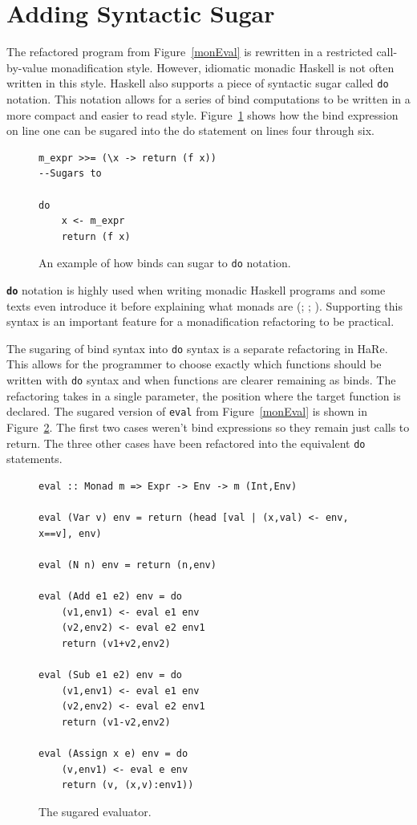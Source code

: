 \section{Adding Syntactic Sugar}

The refactored program from Figure~\ref{monEval} is rewritten in a restricted call-by-value monadification style. However, idiomatic monadic Haskell is not often written in this style. Haskell also supports a piece of syntactic sugar called \texttt{do} notation. This notation allows for a series of bind computations to be written in a more compact and easier to read style. Figure~\ref{doEx} shows how the bind expression on line one can be sugared into the do statement on lines four through six.

\begin{figure}[t]
\begin{lstlisting}
m_expr >>= (\x -> return (f x))
--Sugars to

do
	x <- m_expr
	return (f x)
\end{lstlisting}
\caption{An example of how binds can sugar to \texttt{do} notation.}
\label{doEx}
\end{figure}

\textbf{\texttt{do}} notation is highly used when writing monadic Haskell programs and some texts even introduce it before explaining what monads are (\cite{realWorldHaskell}; \cite{haskellCraft}; \cite{learnYou}). Supporting this syntax is an important feature for a monadification refactoring to be practical. 

The sugaring of bind syntax into \texttt{do} syntax is a separate refactoring in HaRe. This allows for the programmer to choose exactly which functions should be written with \texttt{do} syntax and when functions are clearer remaining as binds. The refactoring takes in a single parameter, the position where the target function is declared. The sugared version of \texttt{eval} from Figure~\ref{monEval} is shown in Figure~\ref{finEval}. The first two cases weren't bind expressions so they remain just calls to return. The three other cases have been refactored into the equivalent \texttt{do} statements.

\begin{figure}[t]
\begin{lstlisting}
eval :: Monad m => Expr -> Env -> m (Int,Env)

eval (Var v) env = return (head [val | (x,val) <- env, x==v], env)

eval (N n) env = return (n,env)

eval (Add e1 e2) env = do
	(v1,env1) <- eval e1 env
	(v2,env2) <- eval e2 env1
	return (v1+v2,env2)

eval (Sub e1 e2) env = do
	(v1,env1) <- eval e1 env 
	(v2,env2) <- eval e2 env1
	return (v1-v2,env2)

eval (Assign x e) env = do
	(v,env1) <- eval e env
	return (v, (x,v):env1))
\end{lstlisting}
\caption{The sugared evaluator.}
\label{finEval}
\end{figure}

